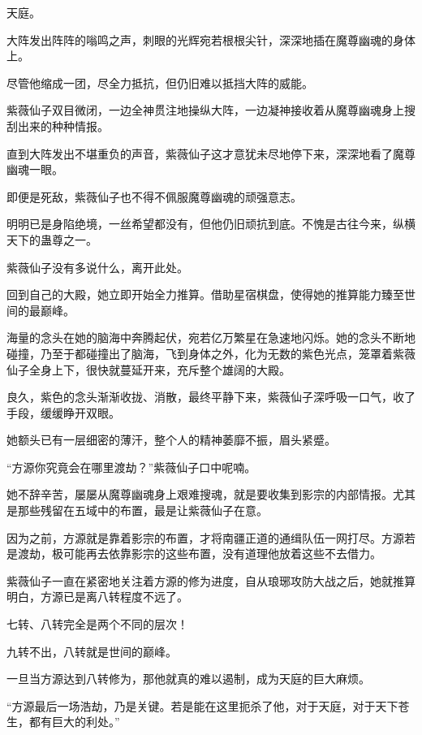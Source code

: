 
\begin{this_body}



天庭。

大阵发出阵阵的嗡鸣之声，刺眼的光辉宛若根根尖针，深深地插在魔尊幽魂的身体上。

尽管他缩成一团，尽全力抵抗，但仍旧难以抵挡大阵的威能。

紫薇仙子双目微闭，一边全神贯注地操纵大阵，一边凝神接收着从魔尊幽魂身上搜刮出来的种种情报。

直到大阵发出不堪重负的声音，紫薇仙子这才意犹未尽地停下来，深深地看了魔尊幽魂一眼。

即便是死敌，紫薇仙子也不得不佩服魔尊幽魂的顽强意志。

明明已是身陷绝境，一丝希望都没有，但他仍旧顽抗到底。不愧是古往今来，纵横天下的蛊尊之一。

紫薇仙子没有多说什么，离开此处。

回到自己的大殿，她立即开始全力推算。借助星宿棋盘，使得她的推算能力臻至世间的最巅峰。

海量的念头在她的脑海中奔腾起伏，宛若亿万繁星在急速地闪烁。她的念头不断地碰撞，乃至于都碰撞出了脑海，飞到身体之外，化为无数的紫色光点，笼罩着紫薇仙子全身上下，很快就蔓延开来，充斥整个雄阔的大殿。

良久，紫色的念头渐渐收拢、消散，最终平静下来，紫薇仙子深呼吸一口气，收了手段，缓缓睁开双眼。

她额头已有一层细密的薄汗，整个人的精神萎靡不振，眉头紧蹙。

“方源你究竟会在哪里渡劫？”紫薇仙子口中呢喃。

她不辞辛苦，屡屡从魔尊幽魂身上艰难搜魂，就是要收集到影宗的内部情报。尤其是那些残留在五域中的布置，最是让紫薇仙子在意。

因为之前，方源就是靠着影宗的布置，才将南疆正道的通缉队伍一网打尽。方源若是渡劫，极可能再去依靠影宗的这些布置，没有道理他放着这些不去借力。

紫薇仙子一直在紧密地关注着方源的修为进度，自从琅琊攻防大战之后，她就推算明白，方源已是离八转程度不远了。

七转、八转完全是两个不同的层次！

九转不出，八转就是世间的巅峰。

一旦当方源达到八转修为，那他就真的难以遏制，成为天庭的巨大麻烦。

“方源最后一场浩劫，乃是关键。若是能在这里扼杀了他，对于天庭，对于天下苍生，都有巨大的利处。”


\end{this_body}
